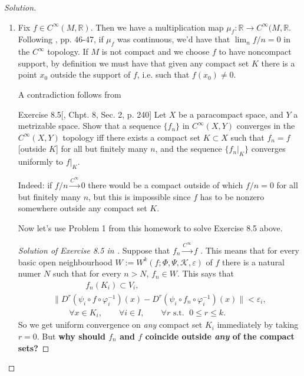 \begin{proof}[Solution]\leavevmode
\begin{enumerate}[label=(\alph*)]
\item Fix \(f \in C^\infty (M,\mathbb{R})\). Then we have a multiplication map \(\mu_f:\mathbb{R}\to C^\infty (M,\mathbb{R}\). Following \cite{gui2}, pp. 46-47, if \(\mu_f\) was continuous, we'd have that \(\lim_{n}f/n=0\) in the \(C^\infty\) topology. If \(M\) is not compact and we choose \(f\) to have noncompact support, by definition we must have that given any compact set \(K\) there is a point \(x_0\) outside the support of \(f\), i.e. such that \(f(x_0)\neq 0\).

	A contradiction follows from

	\begin{thing8}{Exercise 8.5}[\cite{muk}, Chpt. 8, Sec. 2, p. 240]\leavevmode
		Let \(X\) be a paracompact space, and \(Y\) a metrizable space. Show that a sequence \(\{f_n\}\) in \(C^\infty(X,Y)\) converges in the \(C^\infty(X,Y)\) topology iff there exists a compact set \(K \subset X\) such that \(f_n=f\) {\color{2}[outside \(K\)]} for all but finitely many \(n\), and the sequence \(\{f_n|_{K}\}\) converges uniformly to \(f|_{K}\).
	\end{thing8}

	Indeed: if \(f/n \xrightarrow{C^\infty} 0\) there would be a compact outside of which \(f/n=0\) for all but finitely many \(n\), but this is impossible since \(f\) has to be nonzero somewhere outside any compact set \(K\).

	Now let's use Problem 1 from this homework to solve Exercise 8.5 above.

	\begin{proof}[Solution of Exercise 8.5 in \cite{muk}]\leavevmode
Suppose that \(f_n \xrightarrow{C^\infty}f\)	. This means that for every basic open neighbourhood \(W:=W^k(f; \Phi,\Psi,\mathcal{K},\varepsilon)\) of \(f\) there is a natural numer \(N\) such that for every  \(n > N \), \(f_n \in W\). This says that
\begin{gather*}
\qquad  \qquad f_n(K_i)\subset V_i,\\ \|D^r(\psi_i \circ f \circ \varphi_i^{-1})(x)-D^r(\psi_i \circ f_n \circ \varphi_i^{-1})(x)\|<\varepsilon_i,\\
\qquad \forall x \in K_i,\qquad \forall i \in I, \qquad \forall r\text{ s.t. } \; 0 \leq r\leq k.
\end{gather*}
So we get uniform convergence on \textit{any} compact set \(K_i\) immediately by taking \(r=0\). But \textbf{why should \(f_n\) and \(f\) coincide outside \textit{any} of the compact sets?} 
	\end{proof}



\end{enumerate}
\end{proof}
